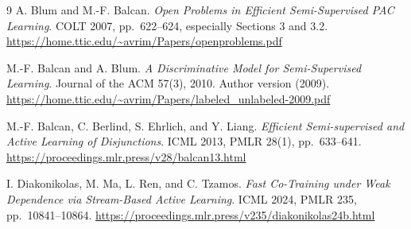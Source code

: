 \documentclass[11pt,a4paper]{article}
\begin{document}
\begin{thebibliography}{9}\small
{}
A. Blum and M.-F. Balcan.
\emph{Open Problems in Efficient Semi-Supervised PAC Learning}.
COLT 2007, pp.\ 622--624, especially Sections 3 and 3.2.
\url{https://home.ttic.edu/~avrim/Papers/openproblems.pdf}

M.-F. Balcan and A. Blum.
\emph{A Discriminative Model for Semi-Supervised Learning}.
Journal of the ACM 57(3), 2010. Author version (2009).
\url{https://home.ttic.edu/~avrim/Papers/labeled_unlabeled-2009.pdf}

M.-F. Balcan, C. Berlind, S. Ehrlich, and Y. Liang.
\emph{Efficient Semi-supervised and Active Learning of Disjunctions}.
ICML 2013, PMLR 28(1), pp.\ 633--641.
\url{https://proceedings.mlr.press/v28/balcan13.html}

I. Diakonikolas, M. Ma, L. Ren, and C. Tzamos.
\emph{Fast Co-Training under Weak Dependence via Stream-Based Active Learning}.
ICML 2024, PMLR 235, pp.\ 10841--10864.
\url{https://proceedings.mlr.press/v235/diakonikolas24b.html}
\end{thebibliography}
\end{document}
